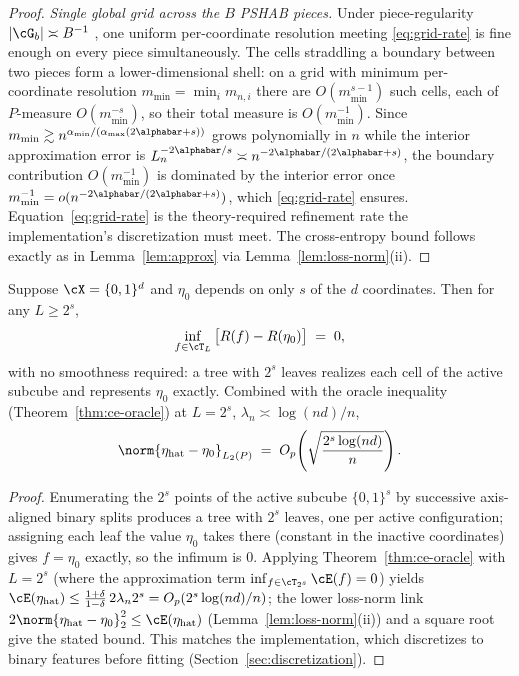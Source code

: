 \begin{proof}
\emph{Single global grid across the $B$ PSHAB pieces.} Under piece-regularity
$|\cG_b| \asymp B^{-1}$ \citep[Remark~6.10]{xuStatisticalOptimalityOptimal2026},
one uniform per-coordinate resolution meeting \eqref{eq:grid-rate} is fine enough
on every piece simultaneously. The cells straddling a boundary between two pieces
form a lower-dimensional shell: on a grid with minimum per-coordinate resolution
$m_{\min} = \min_i m_{n,i}$ there are $O(m_{\min}^{s-1})$ such cells, each of
$P$-measure $O(m_{\min}^{-s})$, so their total measure is $O(m_{\min}^{-1})$.
Since $m_{\min} \gtrsim n^{\alpha_{\min}/(\alpha_{\max}(2\alphabar+s))}$ grows
polynomially in $n$ while the interior approximation error is
$L_n^{-2\alphabar/s} \asymp n^{-2\alphabar/(2\alphabar+s)}$, the boundary
contribution $O(m_{\min}^{-1})$ is dominated by the interior error once
$m_{\min}^{-1} = o(n^{-2\alphabar/(2\alphabar+s)})$, which \eqref{eq:grid-rate}
ensures. Equation~\eqref{eq:grid-rate} is the
theory-required refinement rate the implementation's discretization must meet.
The cross-entropy bound follows exactly as in Lemma~\ref{lem:approx} via
Lemma~\ref{lem:loss-norm}(ii).
\end{proof}

\begin{corollary}\label{cor:binary-rate}
Suppose $\cX = \{0,1\}^d$ and $\eta_0$ depends on only $s$ of the $d$
coordinates. Then for any $L \ge 2^s$,
\[
  \inf_{f \in \cT_L}\, \bigl[ R(f) - R(\eta_0) \bigr] \;=\; 0,
\]
with no smoothness required: a tree with $2^s$ leaves realizes each cell of the
active subcube and represents $\eta_0$ exactly. Combined with the oracle
inequality (Theorem~\ref{thm:ce-oracle}) at $L = 2^s$,
$\lambda_n \asymp \log(nd)/n$,
\[
  \norm{\eta_{\text{hat}} - \eta_0}_{L_2(P)}
  \;=\; O_p\!\left( \sqrt{\frac{2^s \log(nd)}{n}} \right).
\]
\end{corollary}

\begin{proof}
Enumerating the $2^s$ points of the active subcube $\{0,1\}^s$ by successive
axis-aligned binary splits produces a tree with $2^s$ leaves, one per active
configuration; assigning each leaf the value $\eta_0$ takes there (constant in
the inactive coordinates) gives $f = \eta_0$ exactly, so the infimum is $0$.
Applying Theorem~\ref{thm:ce-oracle} with $L = 2^s$ (where the approximation
term $\inf_{f \in \cT_{2^s}} \cE(f) = 0$) yields
$\cE(\eta_{\text{hat}}) \le \frac{1+\delta}{1-\delta}\, 2\lambda_n 2^s
= O_p(2^s \log(nd)/n)$; the lower loss-norm link
$2\norm{\eta_{\text{hat}} - \eta_0}_2^2 \le \cE(\eta_{\text{hat}})$
(Lemma~\ref{lem:loss-norm}(ii)) and a square root give the stated bound. This
matches the implementation, which discretizes to binary features before fitting
(Section~\ref{sec:discretization}).
\end{proof}

